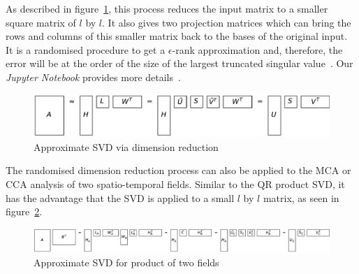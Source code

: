 \documentclass[sigconf]{acmart}
\begin{document}
As described in figure~\ref{fig:reduceSizeRandomisedSquare}, this process reduces the input matrix to a smaller square matrix of $l$ by $l$. It also gives two projection matrices which can bring the rows and columns of this smaller matrix back to the bases of the original input. It is a randomised procedure to get a $\epsilon$-rank approximation and, therefore, the error will be at the order of the size of the largest truncated singular value~\cite{Martinsson2016, Halko2011}. Our \textit{Jupyter Notebook} provides more details~\cite{Bogaardt2018}.

\begin{figure}[h]
\begin{center}
\includegraphics[width=\columnwidth]{Results/reduceSizeRandomisedSquare.pdf}
\caption[Approximate randomised SVD]{Approximate SVD via dimension reduction}
\label{fig:reduceSizeRandomisedSquare}
\end{center}
\end{figure}

The randomised dimension reduction process can also be applied to the MCA or CCA analysis of two spatio-temporal fields. Similar to the QR product SVD, it has the advantage that the SVD is applied to a small $l$ by $l$ matrix, as seen in figure~\ref{fig:randomisedSquareProductSVD}.

\begin{figure}[h]
\begin{center}
\includegraphics[width=\columnwidth]{Results/randomisedSquareProductSVD.pdf}
\caption[Approximate product SVD]{Approximate SVD for product of two fields}
\label{fig:randomisedSquareProductSVD}
\end{center}
\end{figure}
\end{document}
